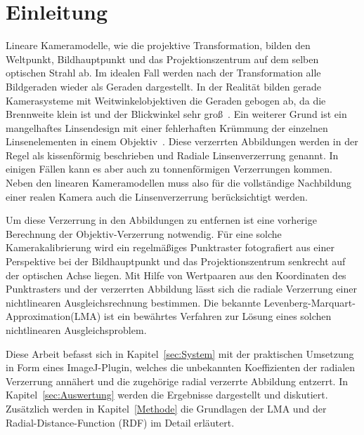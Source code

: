 \section{Einleitung}\label{sec:Introduction}
Lineare Kameramodelle, wie die projektive Transformation, bilden den Weltpunkt, Bildhauptpunkt und das Projektionszentrum auf dem selben optischen Strahl ab. Im idealen Fall werden nach der Transformation alle Bildgeraden wieder als Geraden dargestellt. In der Realität bilden gerade Kamerasysteme mit Weitwinkelobjektiven die Geraden gebogen ab, da die Brennweite klein ist und der Blickwinkel sehr groß~\cite{HartleyRadDist}. Ein weiterer Grund ist ein mangelhaftes Linsendesign mit einer fehlerhaften Krümmung der einzelnen Linsenelementen in einem Objektiv~\cite{WengRadDist}\cite{Zhang:1996:EGT:844381.845228}. Diese verzerrten Abbildungen werden in der Regel als kissenförmig beschrieben und Radiale Linsenverzerrung genannt. In einigen Fällen kann es aber auch zu tonnenförmigen Verzerrungen kommen. Neben den linearen Kameramodellen muss also für die vollständige Nachbildung einer realen Kamera auch die Linsenverzerrung berücksichtigt werden. 

Um diese Verzerrung in den Abbildungen zu entfernen ist eine vorherige Berechnung der Objektiv-Verzerrung notwendig. Für eine solche Kamerakalibrierung wird ein regelmäßiges Punktraster fotografiert aus einer Perspektive bei der Bildhauptpunkt und das Projektionszentrum senkrecht auf der optischen Achse liegen. 
Mit Hilfe von Wertpaaren aus den Koordinaten des Punktrasters und der verzerrten Abbildung lässt sich die radiale Verzerrung einer nichtlinearen Ausgleichsrechnung bestimmen. Die bekannte Levenberg-Marquart-Approximation(LMA) ist ein bewährtes Verfahren zur Lösung eines solchen nichtlinearen Ausgleichsproblem.

Diese Arbeit befasst sich in Kapitel~\ref{sec:System} mit der praktischen Umsetzung in Form eines ImageJ-Plugin, welches die unbekannten Koeffizienten der radialen Verzerrung annähert und die zugehörige radial verzerrte Abbildung entzerrt. In Kapitel~\ref{sec:Auswertung} werden die Ergebnisse dargestellt und diskutiert. Zusätzlich werden in Kapitel~\ref{Methode} die Grundlagen der LMA und der Radial-Distance-Function (RDF) im Detail erläutert.
























